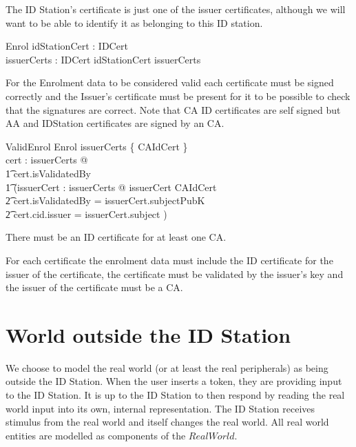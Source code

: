 The ID Station's certificate is just one of the issuer certificates,
although we will want to be able to identify it as belonging to this
ID station. 

\begin{schema}{Enrol}
        idStationCert : IDCert
\\      issuerCerts : \power IDCert
\where
        idStationCert \in issuerCerts
\end{schema}

For the Enrolment data to be considered valid each certificate must be
signed correctly and the Issuer's certificate must be present for it
to be possible to check that the signatures are correct.
Note that CA ID
certificates are self signed but AA and IDStation certificates are
signed by an CA.

\begin{schema}{ValidEnrol}
        Enrol
\where
        issuerCerts \cap \{ CAIdCert \} \neq \emptyset
\also
\\      \forall cert : issuerCerts @ 
\\      \t1     cert.isValidatedBy \neq \Nil 
\\      \t1     \land (\exists issuerCert : issuerCerts @ 
        issuerCert \in CAIdCert 
\\      \t2     \land \The cert.isValidatedBy = issuerCert.subjectPubK
\\      \t2     \land cert.cid.issuer = issuerCert.subject )   
\end{schema}
\begin{Zcomment}
\item
There must be an ID certificate for at least one CA.
\item
For each certificate the enrolment data must include the ID
certificate for the issuer of the certificate, the certificate must be
validated by the issuer's key and the issuer of the
certificate must be a CA.
\end{Zcomment}

\section{World outside the ID Station}
We choose to model the real world (or at least the real peripherals)
as being outside the ID Station.
When the user inserts a token, they are providing input to the ID Station.
It is up to the ID Station to then respond by reading the real world
input into its own, internal representation. The ID Station receives stimulus
from the real world and itself changes the real world. All real world
entities are modelled as components of the $RealWorld$.

